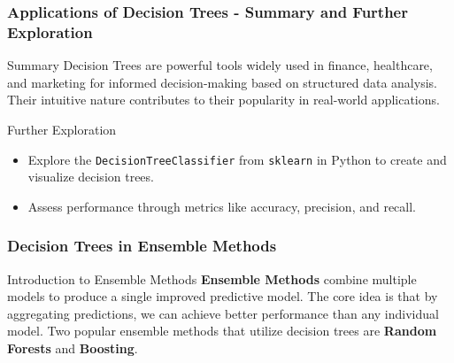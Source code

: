 \documentclass[aspectratio=169]{beamer}
\begin{document}
\begin{frame}[fragile]
    \frametitle{Applications of Decision Trees - Summary and Further Exploration}
    \begin{block}{Summary}
        Decision Trees are powerful tools widely used in finance, healthcare, and marketing for informed decision-making based on structured data analysis. Their intuitive nature contributes to their popularity in real-world applications.
    \end{block}

    \begin{block}{Further Exploration}
        \begin{itemize}
            \item Explore the \texttt{DecisionTreeClassifier} from \texttt{sklearn} in Python to create and visualize decision trees.
            \item Assess performance through metrics like accuracy, precision, and recall.
        \end{itemize}
    \end{block}
\end{frame}

\begin{frame}[fragile]
    \frametitle{Decision Trees in Ensemble Methods}
    \begin{block}{Introduction to Ensemble Methods}
        \textbf{Ensemble Methods} combine multiple models to produce a single improved predictive model. The core idea is that by aggregating predictions, we can achieve better performance than any individual model. Two popular ensemble methods that utilize decision trees are \textbf{Random Forests} and \textbf{Boosting}.
    \end{block}
\end{frame}
\end{document}
